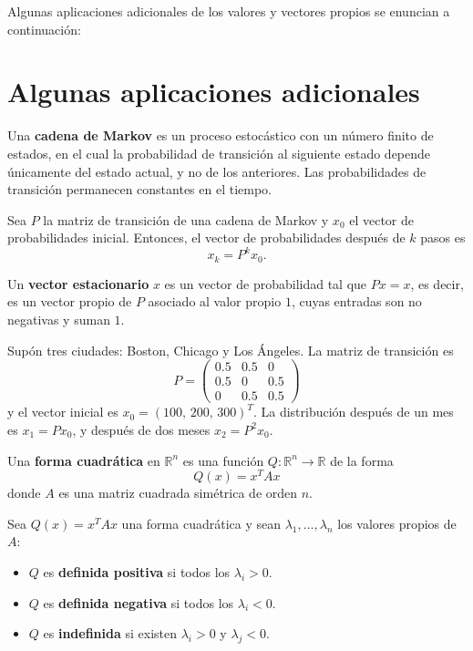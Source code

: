 Algunas aplicaciones adicionales de los valores y vectores propios se enuncian a continuación:

\section{Algunas aplicaciones adicionales}

\begin{definition}
Una \textbf{cadena de Markov} es un proceso estocástico con un número finito de estados, en el cual la probabilidad de transición al siguiente estado depende únicamente del estado actual, y no de los anteriores. Las probabilidades de transición permanecen constantes en el tiempo.
\end{definition}

\begin{theorem}
Sea $P$ la matriz de transición de una cadena de Markov y $x_0$ el vector de probabilidades inicial. Entonces, el vector de probabilidades después de $k$ pasos es
\[
x_k = P^k x_0.
\]
\end{theorem}

\begin{definition}
Un \textbf{vector estacionario} $x$ es un vector de probabilidad tal que $Px = x$, es decir, es un vector propio de $P$ asociado al valor propio $1$, cuyas entradas son no negativas y suman $1$.
\end{definition}

\begin{example}
Supón tres ciudades: Boston, Chicago y Los Ángeles. La matriz de transición es
\[
P = \begin{pmatrix}
0.5 & 0.5 & 0 \\
0.5 & 0 & 0.5 \\
0 & 0.5 & 0.5
\end{pmatrix}
\]
y el vector inicial es $x_0 = (100,\, 200,\, 300)^T$. La distribución después de un mes es $x_1 = P x_0$, y después de dos meses $x_2 = P^2 x_0$.
\end{example}



\begin{definition}
Una \textbf{forma cuadrática} en $\mathbb{R}^n$ es una función $Q:\mathbb{R}^n \to \mathbb{R}$ de la forma
\[
Q(x) = x^T A x
\]
donde $A$ es una matriz cuadrada simétrica de orden $n$.
\end{definition}

\begin{theorem}
Sea $Q(x) = x^T A x$ una forma cuadrática y sean $\lambda_1, \dots, \lambda_n$ los valores propios de $A$:
\begin{itemize}
    \item $Q$ es \textbf{definida positiva} si todos los $\lambda_i > 0$.
    \item $Q$ es \textbf{definida negativa} si todos los $\lambda_i < 0$.
    \item $Q$ es \textbf{indefinida} si existen $\lambda_i > 0$ y $\lambda_j < 0$.
\end{itemize}
\end{theorem}

